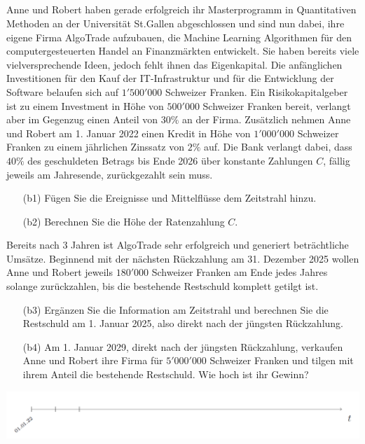 \subsection*{}
Anne und Robert haben gerade erfolgreich ihr Masterprogramm in Quantitativen
Methoden an der Universität St.Gallen abgeschlossen und sind nun dabei, ihre eigene
Firma AlgoTrade aufzubauen, die Machine Learning Algorithmen für den computergesteuerten Handel an Finanzmärkten entwickelt. Sie haben bereits viele vielversprechende Ideen, jedoch fehlt ihnen das Eigenkapital. Die anfänglichen Investitionen für den Kauf der IT-Infrastruktur und für die Entwicklung der Software belaufen sich auf $1'500'000$ Schweizer Franken.
Ein Risikokapitalgeber ist zu einem Investment in Höhe von $500'000$ Schweizer Franken bereit, verlangt aber im Gegenzug einen Anteil von $30 \%$ an der Firma.
Zusätzlich nehmen Anne und Robert am 1. Januar 2022 einen Kredit in Höhe von $1'000'000$ Schweizer Franken zu einem jährlichen Zinssatz von $2 \% $ auf.
Die Bank verlangt dabei, dass $40 \%$ des geschuldeten Betrags bis Ende 2026 über konstante Zahlungen $C$, fällig jeweils am Jahresende, zurückgezahlt sein muss.
\begin{enumerate}
	\item[(b1)] Fügen Sie die Ereignisse und Mittelflüsse dem Zeitstrahl hinzu.
	\item[(b2)] Berechnen Sie die Höhe der Ratenzahlung $C$.
\end{enumerate}
Bereits nach 3 Jahren ist AlgoTrade sehr erfolgreich und generiert beträchtliche Umsätze. Beginnend mit der nächsten Rückzahlung am 31. Dezember 2025 wollen Anne und Robert jeweils $180'000$ Schweizer Franken am Ende jedes Jahres solange zurückzahlen, bis die bestehende Restschuld komplett getilgt ist.
\begin{enumerate}
	\item[(b3)] Ergänzen Sie die Information am Zeitstrahl und berechnen Sie die Restschuld am 1. Januar 2025, also direkt nach der jüngsten Rückzahlung.
	\item[(b4)] Am 1. Januar 2029, direkt nach der jüngsten Rückzahlung, verkaufen Anne und Robert	ihre Firma für $5'000'000$ Schweizer Franken und tilgen mit ihrem Anteil die bestehende	Restschuld. Wie hoch ist ihr Gewinn?
\end{enumerate}
\begin{center}
	\includegraphics[scale=0.45]{pictures/zeitstrahl_1_b}
\end{center}
\newpage
